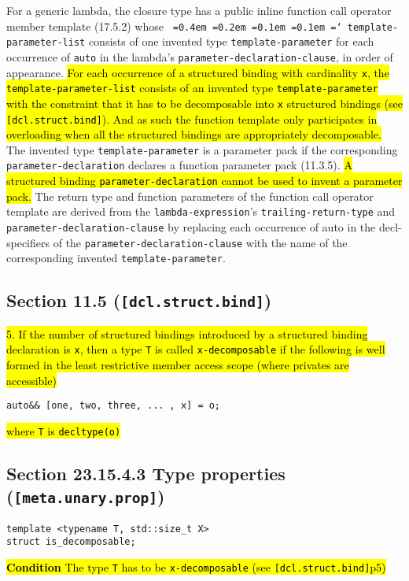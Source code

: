\documentclass{article}
\DeclareRobustCommand{\hlgreen}[1]{{\sethlcolor{green}\hl{#1}}}
\newcommand*\justify{%
  \fontdimen2\font=0.4em%
  \fontdimen3\font=0.2em%
  \fontdimen4\font=0.1em%
  \fontdimen7\font=0.1em%
  \hyphenchar\font=`\-%
}
\begin{document}
For a generic lambda, the closure type has a public inline function call
operator member template (17.5.2) whose \texttt{\justify template-parameter-list}
consists of one invented type \texttt{template-parameter} for each occurrence
of \texttt{auto} in the lambda’s \texttt{parameter-declaration-clause}, in
order of appearance.  \hlgreen{For each occurrence of a structured binding with
cardinality \texttt{x}, the \texttt{template-parameter-list} consists of an
invented type \texttt{template-parameter} with the constraint that it has to
be decomposable into \texttt{x} structured bindings (see
\texttt{[dcl.struct.bind]}).  And as such the function template only
participates in overloading when all the structured bindings are appropriately
decomposable.} The invented type \texttt{template-parameter} is a parameter
pack if the corresponding \texttt{parameter-declaration} declares a function
parameter pack (11.3.5).  \hlgreen{A structured binding
\texttt{parameter-declaration} cannot be used to invent a parameter pack.} The
return type and function parameters of the function call operator template are
derived from the \texttt{lambda-expression}’s \texttt{trailing-return-type}
and \texttt{parameter-declaration-clause} by replacing each occurrence of auto
in the decl-specifiers of the \texttt{parameter-declaration-clause} with the
name of the corresponding invented \texttt{template-parameter}.


\subsection{Section 11.5 (\texttt{[dcl.struct.bind]})}

\hlgreen{5.  If the number of structured bindings introduced by a structured
binding declaration is \texttt{x}, then a type \texttt{T} is called
\texttt{x-decomposable} if the following is well formed in the least
restrictive member access scope (where privates are accessible)}
\begin{lstlisting}
auto&& [one, two, three, ... , x] = o;
\end{lstlisting}

\hlgreen{where \texttt{T} is \texttt{decltype(o)}}

\subsection{Section 23.15.4.3 Type properties (\texttt{[meta.unary.prop]})}

\begin{lstlisting}
template <typename T, std::size_t X>
struct is_decomposable;
\end{lstlisting}

\hlgreen{\textbf{Condition} The type \texttt{T} has to be
\texttt{x-decomposable} (see \texttt{[dcl.struct.bind]}p5)}
\end{document}
